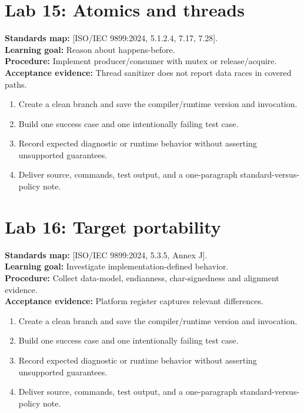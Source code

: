 \documentclass[10pt,letterpaper,oneside]{report}
\newcommand{\refcl}[1]{\textsf{\footnotesize[ISO/IEC 9899:2024, #1]}}
\begin{document}
\section{Lab 15: Atomics and threads}
\textbf{Standards map:} \refcl{5.1.2.4, 7.17, 7.28}.\\
\textbf{Learning goal:} Reason about happens-before.\\
\textbf{Procedure:} Implement producer/consumer with mutex or release/acquire.\\
\textbf{Acceptance evidence:} Thread sanitizer does not report data races in covered paths.
\begin{enumerate}
\item Create a clean branch and save the compiler/runtime version and invocation.
\item Build one success case and one intentionally failing test case.
\item Record expected diagnostic or runtime behavior without asserting unsupported guarantees.
\item Deliver source, commands, test output, and a one-paragraph standard-versus-policy note.
\end{enumerate}

\section{Lab 16: Target portability}
\textbf{Standards map:} \refcl{5.3.5, Annex J}.\\
\textbf{Learning goal:} Investigate implementation-defined behavior.\\
\textbf{Procedure:} Collect data-model, endianness, char-signedness and alignment evidence.\\
\textbf{Acceptance evidence:} Platform register captures relevant differences.
\begin{enumerate}
\item Create a clean branch and save the compiler/runtime version and invocation.
\item Build one success case and one intentionally failing test case.
\item Record expected diagnostic or runtime behavior without asserting unsupported guarantees.
\item Deliver source, commands, test output, and a one-paragraph standard-versus-policy note.
\end{enumerate}
\end{document}
